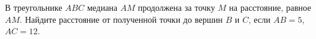 \begin{listofex}
	\item {}
	\item {}
	\item {}
	\item {}
	\item {}
	\item {}
	\item В треугольнике \( ABC \) медиана \( AM \) продолжена за точку \( M \) на расстояние, равное \( AM \). Найдите расстояние от полученной точки до вершин \( B  \) и \( C\), если \( AB = 5\), \( AC = 12\).
	\item {}
	\item {}
\end{listofex}
%
